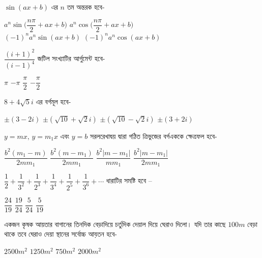 \documentclass[addpoints]{exam}
\begin{document}
\begin{questions}
\begin{oneparchoices}
\end{oneparchoices}

\question  $ \sin (ax +b) $ এর $ n $ তম অন্তরক হবে-

\begin{oneparchoices}
\choice  $a^{n} \sin\Big(\dfrac{n\pi}{2} + ax+b\Big)$
\choice  $a^{n} \cos\Big(\dfrac{n\pi}{2} + ax+b\Big)$\\
\choice  $(-1)^{n}a^{n} \sin (ax +b) $
\choice  $(-1)^{n}a^{n} \cos (ax +b) $
\end{oneparchoices}

\question $ \dfrac{(i+1)^{2}}{(i-1)^{4}} $  জটিল সংখ্যাটির আর্গুমেন্ট হবে-

\begin{oneparchoices}
\choice $ \pi $
\choice $ -\pi $
\choice $  \dfrac{\pi}{2} $
\choice  $  -\dfrac{\pi}{2} $

\end{oneparchoices}

\question $ 8+4\sqrt{5}i $ এর বর্গমূল হবে-

\begin{oneparchoices}
\choice $ \pm(3-2i) $
\choice $ \pm(\sqrt{10} + \sqrt{2}i) $
\choice $ \pm(\sqrt{10} - \sqrt{2}i) $
\choice $ \pm(3+2i) $

\end{oneparchoices}

\question  $ y=mx,\, y=m_{1}x $ এবং $ y=b  $ সরলরেখাদ্বয় দ্বারা গঠিত ত্রিভুজের বর্গএককে ক্ষেত্রফল হবে-

\begin{oneparchoices}
\choice $ \dfrac{b^{2}(m_{1}-m)}{2mm_{1}} $
\choice  $ \dfrac{b^{2}(m-m_{1})}{2mm_{1}} $
\choice $ \dfrac{b^{2}|m-m_{1}|}{mm_{1}} $
\choice $ \dfrac{b^{2}|m-m_{1}|}{2mm_{1}} $

\end{oneparchoices}


\question $ \dfrac{1}{2} + \dfrac{1}{3^{2}} + \dfrac{1}{2^{3}} + \dfrac{1}{3^{4}} + \dfrac{1}{2^{5}}+ \dfrac{1}{3^{6}}+\cdots $  ধারাটির সমষ্টি হবে – 

\begin{oneparchoices}
\choice  $ \dfrac{24}{19} $
\choice  $ \dfrac{19}{24} $
\choice  $ \dfrac{5}{24} $
\choice $ \dfrac{5}{19} $
\end{oneparchoices}

\question  একজন কৃষক আয়তার বাগানের তিনদিক বেড়াদিয়ে চর্তুদিক দেয়াল দিয়ে ঘেরাও দিলো। যদি তার কাছে $100m$ বেড়া থাকে তবে ঘেরাও দেয়া স্থানের সর্বোচ্চ আয়তন হবে-
 
\begin{oneparchoices}
\choice $ 2500m^{2} $
\choice $ 1250m^{2} $
\choice $ 750m^{2} $
\choice $ 2000m^{2} $
\end{oneparchoices}


\end{questions}
\end{document}
